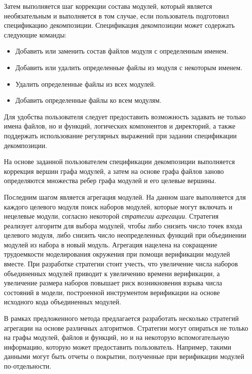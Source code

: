 Затем выполняется шаг коррекции состава модулей, который является необязательным и выполняется в том случае, если пользователь подготовил спецификацию декомпозиции.
Спецификация декомпозиции может содержать следующие команды:
\begin{itemize}
    \item Добавить или заменить состав файлов модуля с определенным именем.
    \item Добавить или удалить определенные файлы из модуля с некоторым именем.
    \item Удалить определенные файлы из всех модулей.
    \item Добавить определенные файлы ко всем модулям.
\end{itemize}

Для удобства пользователя следует предоставить возможность задавать не только имена файлов, но и функций, логических компонентов и директорий, а также поддержать использование регулярных выражений при задании спецификации декомпозиции.

На основе заданной пользователем спецификации декомпозиции выполняется коррекция вершин графа модулей, а затем на основе графа файлов заново определяются множества ребер графа модулей и его целевые вершины. 

Последним шагом является агрегация модулей.
На данном шаге выполняется для каждого целевого модуля поиск наборов модулей, которые могут включать и нецелевые модули, согласно некоторой \textit{стратегии агрегации}.
Стратегия реализует алгоритм для выбора модулей, чтобы либо снизить число точек входа целевого модуля, либо снизить число неопределенных функций при объединении модулей из набора в новый модуль.
Агрегация нацелена на сокращение трудоемкости моделирования окружения при помощи верификации модулей вместе.
При разработке стратегии стоит учесть, что увеличение числа наборов объединенных модулей приводит к увеличению времени верификации, а увеличение размера наборов повышает риск возникновения взрыва числа состояний в модели, построенной инструментом верификации на основе исходного кода объединенных модулей.

В рамках предложенного метода предлагается разработать несколько стратегий агрегации на основе различных алгоритмов.
Стратегии могут опираться не только на графы модулей, файлов и функций, но и на некоторую вспомогательную информацию, которую может предоставить пользователь.
Например, такими данными могут быть отчеты о покрытии, полученные при верификации модулей по-отдельности.

